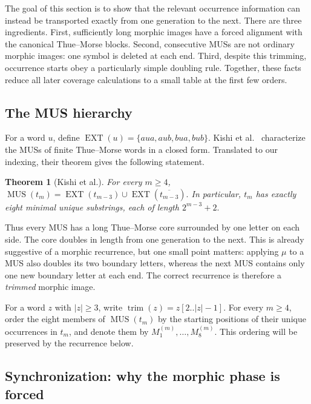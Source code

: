 \documentclass[11pt,a4paper]{article}
\newtheorem{theorem}{Theorem}[section]
\theoremstyle{definition}\newtheorem{definition}[theorem]{Definition}
\theoremstyle{remark}\newtheorem{remark}[theorem]{Remark}
\newcommand{\MUS}{\operatorname{MUS}}
\begin{document}
The goal of this section is to show that the relevant occurrence information can instead be transported exactly from one generation to the next. There are three ingredients. First, sufficiently long morphic images have a forced alignment with the canonical Thue--Morse blocks. Second, consecutive MUSs are not ordinary morphic images: one symbol is deleted at each end. Third, despite this trimming, occurrence starts obey a particularly simple doubling rule. Together, these facts reduce all later coverage calculations to a small table at the first few orders.

\subsection{The MUS hierarchy}
\label{subsec:mus-hierarchy}

For a word $u$, define
$
\operatorname{EXT}(u)=\{aua,aub,bua,bub\}.
$
Kishi et al.~\cite{Kishi2026} characterize the MUSs of finite Thue--Morse words in a closed form. Translated to our indexing, their theorem gives the following statement.

\begin{theorem}[Kishi et al.]
\label{thm:kishi-mus}
For every $m\ge4$,
$
\MUS(t_m)=\operatorname{EXT}(t_{m-3})\cup
\operatorname{EXT}(\overline{t_{m-3}}).
$
In particular, $t_m$ has exactly eight minimal unique substrings, each of length
$
2^{m-3}+2.
$
\end{theorem}

Thus every MUS has a long Thue--Morse core surrounded by one letter on each side. The core doubles in length from one generation to the next. This is already suggestive of a morphic recurrence, but one small point matters: applying $\mu$ to a MUS also doubles its two boundary letters, whereas the next MUS contains only one new boundary letter at each end. The correct recurrence is therefore a \emph{trimmed} morphic image.

For a word $z$ with $|z|\ge3$, write
$
\operatorname{trim}(z)=z[2..|z|-1].
$
For every $m\ge4$, order the eight members of $\MUS(t_m)$ by the starting positions of their unique occurrences in $t_m$, and denote them by
$
M_1^{(m)},\ldots,M_8^{(m)}.
$
This ordering will be preserved by the recurrence below.

\subsection{Synchronization: why the morphic phase is forced}
\label{subsec:synchronization}
\end{document}
